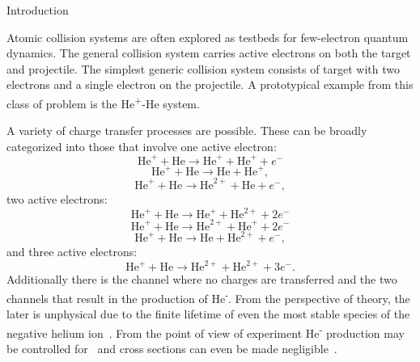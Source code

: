 \documentclass[aps, pra, reprint, groupedaddress, amsfonts,
               amsmath, amssymb, showpacs, nofootinbib]{revtex4-1}
\begin{document}
\begin{section}{Introduction \label{sec:intro}}

   Atomic collision systems are often explored as testbeds for few-electron quantum dynamics. The
   general collision system carries active electrons on both the target and projectile. The simplest
   generic collision system consists of target with two electrons and a single electron on the
   projectile. A prototypical example from this class of problem is the He\textsuperscript{+}-He system.

   A variety of charge transfer processes are possible. These can be broadly categorized into those that
   involve one active electron:
   \begin{equation} \label{eq:tpi111}
      \mathrm{He}^+ + \mathrm{He} \rightarrow \mathrm{He}^+ + \mathrm{He}^+ + e^-
   \end{equation}
   \begin{equation} \label{eq:tpi120}
      \mathrm{He}^+ + \mathrm{He} \rightarrow \mathrm{He} + \mathrm{He}^+,
   \end{equation}
   \begin{equation} \label{eq:tpi201}
      \mathrm{He}^+ + \mathrm{He} \rightarrow \mathrm{He}^{2+} + \mathrm{He} + e^-,
   \end{equation}
   two active electrons:
   \begin{equation} \label{012}
      \mathrm{He}^+ + \mathrm{He} \rightarrow \mathrm{He}^+ + \mathrm{He}^{2+} + 2e^-
   \end{equation}
   \begin{equation} \label{eq:tpi102}
      \mathrm{He}^+ + \mathrm{He} \rightarrow \mathrm{He}^{2+} + \mathrm{He}^+ + 2e^-
   \end{equation}
   \begin{equation} \label{eq:tpi021}
      \mathrm{He}^+ + \mathrm{He} \rightarrow \mathrm{He} + \mathrm{He}^{2+} + e^-,
   \end{equation}
   and three active electrons:
   \begin{equation} \label{eq:tpi003}
      \mathrm{He}^+ + \mathrm{He} \rightarrow \mathrm{He}^{2+} + \mathrm{He}^{2+} + 3e^{-}.
   \end{equation}
   Additionally there is the channel where no charges are transferred and the two channels that result
   in the production of He\textsuperscript{-}. From the perspective of theory, the later is unphysical
   due to the finite lifetime of even the most stable species of the negative helium
   ion~\cite{neghelife}. From the point of view of experiment He\textsuperscript{-} production
   may be controlled for~\cite{metahe} and cross sections can even be made negligible~\cite{neghe-neg}.


\end{section}
\end{document}
